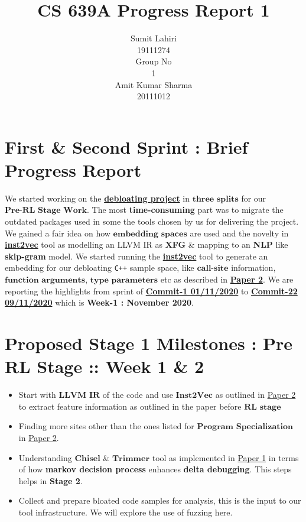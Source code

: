 \documentclass{article} %
\title{CS 639A Progress Report 1}
\author{
Sumit Lahiri \\
19111274 \\
\And
Group No\\
1\\
\And
Amit Kumar Sharma \\
20111012\\
}
\begin{document}
\maketitle

\section*{First \& Second Sprint : Brief Progress Report}
We started working on the \textbf{\href{https://github.com/lahiri-phdworks/reinforcedlearning-debloater}{debloating project}} in $\textbf{three splits}$ for our $\textbf{Pre-RL Stage Work}$. The most \textbf{time-consuming} part was to migrate the outdated packages used in some the tools chosen by us for delivering the project. We gained a fair idea on how $\textbf{embedding spaces}$ are used and the novelty in \textbf{\href{https://github.com/lahiri-phdworks/ncc}{inst2vec}} tool as modelling an LLVM IR as \textbf{XFG} \& mapping to an \textbf{NLP} like \textbf{skip-gram} model. We started running the \textbf{\href{https://github.com/lahiri-phdworks/ncc}{inst2vec}} tool to generate an embedding for our debloating \texttt{C++} sample space, like $\textbf{call-site}$ information, $\textbf{function arguments}$, $\textbf{type parameters}$ etc as described in \textbf{\href{http://www.csl.sri.com/users/gehani/papers/MLSys-2019.DeepOCCAM.pdf}{Paper 2}}. We are reporting the highlights from sprint of \textbf{\href{https://github.com/lahiri-phdworks/reinforcedlearning-debloater/commit/dd63911895cb31cdc77c9debd57090422ffb3b65}{Commit-1 01/11/2020}} to 
\textbf{\href{https://github.com/lahiri-phdworks/reinforcedlearning-debloater/commit/8066e7b7b7fa7513e3611e3f3aee6fb72c81ea83}{Commit-22 09/11/2020}} which is \textbf{Week-1 : November 2020}.

\section*{Proposed Stage 1 Milestones : Pre RL Stage :: Week 1 \& 2}
\begin{itemize}
	\item Start with $\textbf{LLVM IR}$ of the code and use $\textbf{Inst2Vec}$ as outlined in \href{http://www.csl.sri.com/users/gehani/papers/MLSys-2019.DeepOCCAM.pdf}{Paper 2} to extract feature information as outlined in the paper before $\textbf{RL stage}$
	\item Finding more sites other than the ones listed for $\textbf{Program Specialization}$ in \href{http://www.csl.sri.com/users/gehani/papers/MLSys-2019.DeepOCCAM.pdf}{Paper 2}.  
	\item Understanding $\textbf{Chisel}$ \& $\textbf{Trimmer}$ tool as implemented in \href{https://dl.acm.org/doi/10.1145/3243734.3243838}{Paper 1} in terms of how \textbf{markov decision process} enhances \textbf{delta debugging}. This steps helps in \textbf{Stage 2}.
	\item Collect and prepare bloated code samples for analysis, this is the input to our tool infrastructure. We will explore the use of fuzzing here.  
\end{itemize}
\end{document}
